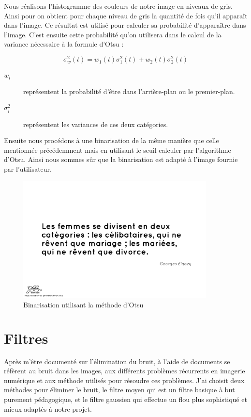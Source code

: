 \documentclass[11pt]{report}
\begin{document}
Nous réalisons l'histogramme des couleurs de notre image en niveaux de gris. Ainsi pour on obtient pour chaque niveau de gris la quantité de fois qu'il apparaît dans l'image. Ce résultat est utilisé pour calculer sa probabilité d’apparaître dans l’image. C'est ensuite cette probabilité qu’on utilisera dans le calcul de la variance nécessaire à la formule d’Otsu :

\[ \sigma ^{2}_{w} \left( t\right) = w_{1}\left( t\right) \sigma ^{2}_{1}\left( t\right) + w_{2}\left( t\right) \sigma ^{2}_{2}\left( t\right) \]

\begin{description}
\item[$w_{i}$] représentent la probabilité d'être dans l'arrière-plan ou le premier-plan.
\item[$\sigma ^{2}_{i}$] représentent les variances de ces deux catégories.
\end{description}

\medskip

Ensuite nous procédons à une binarisation de la même manière que celle mentionnée précédemment mais en utilisant le seuil calculer par l'algorithme d'Otsu. Ainsi nous sommes sûr que la binarisation est adapté à l’image fournie par l'utilisateur.

\begin{figure}[htbp]
\centering
\includegraphics[width=10cm]{b_otsu.png}
\caption{Binarisation utilisant la méthode d'Otsu}
\end{figure}

\section{Filtres}

Après m'être documenté sur l'élimination du bruit, à l'aide de documents se réfèrent au bruit dans les images, aux différents problèmes récurrents en imagerie numérique et aux méthode utilisés pour résoudre ces problèmes. J'ai choisit deux méthodes pour éliminer le bruit, le filtre moyen qui est un filtre basique à but purement pédagogique, et le filtre gaussien qui effectue un flou plus sophistiqué et mieux adaptés à notre projet. 
\end{document}
